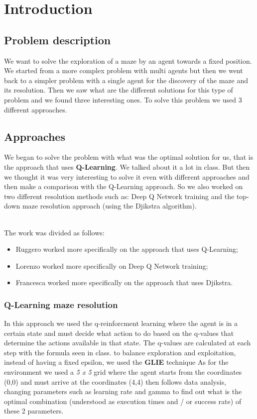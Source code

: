 \chapter{Introduction}


\section{Problem description}
We want to solve the exploration of a maze by an agent towards a fixed position.
We started from a more complex problem with multi agents but then we went back to a simpler problem with a single agent for the discovery of the maze and its resolution. Then we saw what are the different solutions for this type of problem and we found three interesting ones.
To solve this problem we used 3 different approaches.


\section{Approaches}

We began to solve the problem with what was the optimal solution for us, that is the approach that uses \textbf{Q-Learning}. We talked about it a lot in class.
 But then we thought it was very interesting to solve it even with different approaches and then make a comparison with the Q-Learning approach. So we also worked on two different resolution methods such as: Deep Q Network training and the top-down maze resolution approach (using the Djikstra algorithm).

\\
The work was divided as follows:
\begin{itemize}
\item Ruggero worked more specifically on the approach that uses Q-Learning;
\item Lorenzo worked more specifically on Deep Q Network training;
\item Francesca worked more specifically on the approach that uses Djikstra.

\end{itemize}




\subsection{Q-Learning maze resolution }
In this approach we used the q-reinforcment learning where the agent is in a certain state and must decide what action to do based on the q-values that determine the actions available in that state. 
The q-values are calculated at each step with the formula seen in class. 
to balance exploration and exploitation, instead of having a fixed epsilon, we used the \textbf{GLIE} technique
As for the environment we used a \textit{5 x 5} grid where the agent starts from the coordinates (0,0) and must arrive at the coordinates (4,4)
then follows data analysis, changing parameters such as learning rate and gamma to find out what is the optimal combination (understood as execution times and / or success rate) of these 2 parameters.

